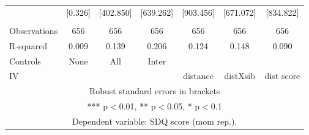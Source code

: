 \begin{tabular}{lcccccc}
 & [0.326] & [402.850] & [639.262] & [903.456] & [671.072] & [834.822] \\
 &  &  &  &  &  &  \\
Observations & 656 & 656 & 656 & 656 & 656 & 656 \\
R-squared & 0.009 & 0.139 & 0.206 & 0.124 & 0.148 & 0.090 \\
Controls & None & All & Inter &  &  &  \\
 IV &  &  &  & distance & distXsib & dist score \\ \hline
\multicolumn{7}{c}{ Robust standard errors in brackets} \\
\multicolumn{7}{c}{ *** p$<$0.01, ** p$<$0.05, * p$<$0.1} \\
\multicolumn{7}{c}{ Dependent variable: SDQ score (mom rep.).} \\
\end{tabular}
